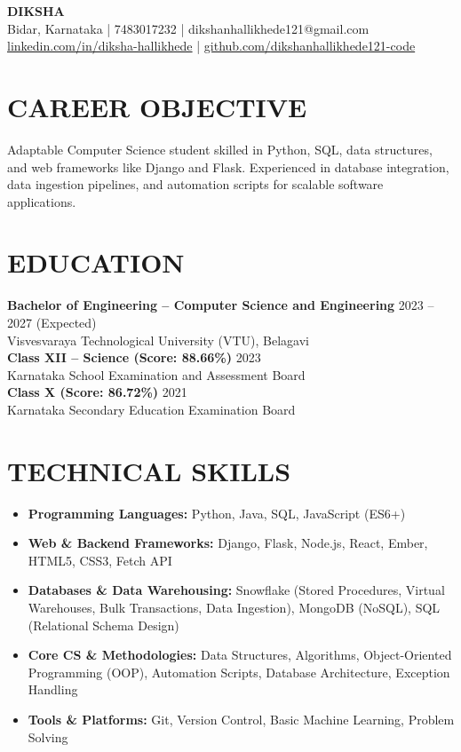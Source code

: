 \documentclass{article}
\begin{document}
\begin{center}
    {\Huge \textbf{DIKSHA}} \\[6pt]
    Bidar, Karnataka | 7483017232 | dikshanhallikhede121@gmail.com \\
    \href{https://linkedin.com/in/diksha-hallikhede}{linkedin.com/in/diksha-hallikhede} | \href{https://github.com/dikshanhallikhede121-code}{github.com/dikshanhallikhede121-code}
\end{center}

\section*{CAREER OBJECTIVE}
Adaptable Computer Science student skilled in Python, SQL, data structures, and web frameworks like Django and Flask. Experienced in database integration, data ingestion pipelines, and automation scripts for scalable software applications.

\section*{EDUCATION}
\textbf{Bachelor of Engineering – Computer Science and Engineering} \hfill 2023 – 2027 (Expected)\\
Visvesvaraya Technological University (VTU), Belagavi \\[4pt]
\textbf{Class XII – Science (Score: 88.66\%)} \hfill 2023\\
Karnataka School Examination and Assessment Board \\[4pt]
\textbf{Class X (Score: 86.72\%)} \hfill 2021\\
Karnataka Secondary Education Examination Board

\section*{TECHNICAL SKILLS}
\begin{itemize}[leftmargin=*]
    \item \textbf{Programming Languages:} Python, Java, SQL, JavaScript (ES6+)
    \item \textbf{Web \& Backend Frameworks:} Django, Flask, Node.js, React, Ember, HTML5, CSS3, Fetch API
    \item \textbf{Databases \& Data Warehousing:} Snowflake (Stored Procedures, Virtual Warehouses, Bulk Transactions, Data Ingestion), MongoDB (NoSQL), SQL (Relational Schema Design)
    \item \textbf{Core CS \& Methodologies:} Data Structures, Algorithms, Object-Oriented Programming (OOP), Automation Scripts, Database Architecture, Exception Handling
    \item \textbf{Tools \& Platforms:} Git, Version Control, Basic Machine Learning, Problem Solving
\end{itemize}
\end{document}
